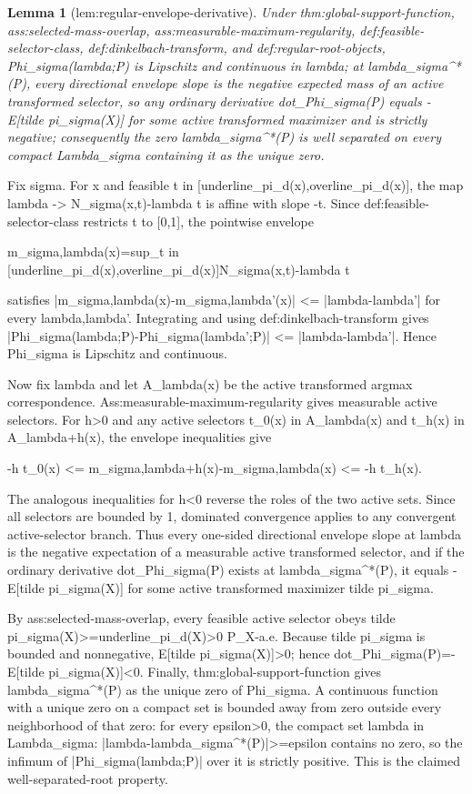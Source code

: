 \documentclass{article}
\newtheorem{lemma}{Lemma}
\begin{document}
\begin{lemma}[lem:regular-envelope-derivative]\label{lem:regular-envelope-derivative}
Under thm:global-support-function, ass:selected-mass-overlap, ass:measurable-maximum-regularity, def:feasible-selector-class, def:dinkelbach-transform, and def:regular-root-objects, Phi_sigma(lambda;P) is Lipschitz and continuous in lambda; at lambda_sigma^*(P), every directional envelope slope is the negative expected mass of an active transformed selector, so any ordinary derivative dot_Phi_sigma(P) equals -E[tilde pi_sigma(X)] for some active transformed maximizer and is strictly negative; consequently the zero lambda_sigma^*(P) is well separated on every compact Lambda_sigma containing it as the unique zero.
\end{lemma}
Fix sigma. For x and feasible t in [underline_pi_d(x),overline_pi_d(x)], the map lambda -> N_sigma(x,t)-lambda t is affine with slope -t. Since def:feasible-selector-class restricts t to [0,1], the pointwise envelope

 m_{sigma,lambda}(x)=sup_{t in [underline_pi_d(x),overline_pi_d(x)]}{N_sigma(x,t)-lambda t}

satisfies |m_{sigma,lambda}(x)-m_{sigma,lambda'}(x)| <= |lambda-lambda'| for every lambda,lambda'. Integrating and using def:dinkelbach-transform gives |Phi_sigma(lambda;P)-Phi_sigma(lambda';P)| <= |lambda-lambda'|. Hence Phi_sigma is Lipschitz and continuous.

Now fix lambda and let A_lambda(x) be the active transformed argmax correspondence. Ass:measurable-maximum-regularity gives measurable active selectors. For h>0 and any active selectors t_0(x) in A_lambda(x) and t_h(x) in A_{lambda+h}(x), the envelope inequalities give

 -h t_0(x) <= m_{sigma,lambda+h}(x)-m_{sigma,lambda}(x) <= -h t_h(x).

The analogous inequalities for h<0 reverse the roles of the two active sets. Since all selectors are bounded by 1, dominated convergence applies to any convergent active-selector branch. Thus every one-sided directional envelope slope at lambda is the negative expectation of a measurable active transformed selector, and if the ordinary derivative dot_Phi_sigma(P) exists at lambda_sigma^*(P), it equals -E[tilde pi_sigma(X)] for some active transformed maximizer tilde pi_sigma.

By ass:selected-mass-overlap, every feasible active selector obeys tilde pi_sigma(X)>=underline_pi_d(X)>0 P_X-a.e. Because tilde pi_sigma is bounded and nonnegative, E[tilde pi_sigma(X)]>0; hence dot_Phi_sigma(P)=-E[tilde pi_sigma(X)]<0. Finally, thm:global-support-function gives lambda_sigma^*(P) as the unique zero of Phi_sigma. A continuous function with a unique zero on a compact set is bounded away from zero outside every neighborhood of that zero: for every epsilon>0, the compact set {lambda in Lambda_sigma: |lambda-lambda_sigma^*(P)|>=epsilon} contains no zero, so the infimum of |Phi_sigma(lambda;P)| over it is strictly positive. This is the claimed well-separated-root property.
\end{document}
